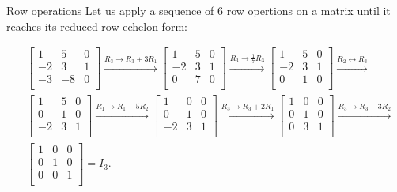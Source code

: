 \begin{example}{Row operations}{}
	Let us apply a sequence of 6 row opertions on a matrix until it reaches its reduced row-echelon form:

	\begin{align*}
		&
		\begin{bmatrix}
			 1 &  5 & 0 \\
			-2 &  3 & 1 \\
			-3 & -8 & 0 \\
		\end{bmatrix}
		\xrightarrow[]{R_{3}\to R_{3}+3R_{1}}
		\begin{bmatrix}
			 1 & 5 & 0 \\
			-2 & 3 & 1 \\
			 0 & 7 & 0 \\
		\end{bmatrix}
		\xrightarrow[]{R_{3}\to \frac{1}{7}R_{3}}
		\begin{bmatrix}
			 1 & 5 & 0 \\
			-2 & 3 & 1 \\
			 0 & 1 & 0 \\
		\end{bmatrix}
		\xrightarrow[]{R_{2}\leftrightarrow R_{3}}
		\\&
		\begin{bmatrix}
			 1 & 5 & 0 \\
			 0 & 1 & 0 \\
			-2 & 3 & 1 \\
		\end{bmatrix}
		\xrightarrow[]{R_{1}\to R_{1}-5R_{2}}
		\begin{bmatrix}
			 1 & 0 & 0 \\
			 0 & 1 & 0 \\
			-2 & 3 & 1 \\
		\end{bmatrix}
		\xrightarrow[]{R_{3}\to R_{3}+2R_{1}}
		\begin{bmatrix}
			 1 & 0 & 0 \\
			 0 & 1 & 0 \\
			 0 & 3 & 1 \\
		\end{bmatrix}
		\xrightarrow[]{R_{3}\to R_{3}-3R_{2}}
		\\&
		\begin{bmatrix}
			 1 & 0 & 0 \\
			 0 & 1 & 0 \\
			 0 & 0 & 1 \\
	    \end{bmatrix}=I_{3}.
	\end{align*}
\end{example}


